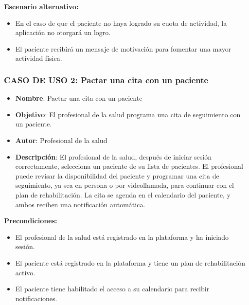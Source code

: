 \documentclass{article}
\begin{document}
\textbf{Escenario alternativo:}
\begin{itemize}
	\item En el caso de que el paciente no haya logrado su cuota de actividad, la aplicación no otorgará un logro.
	\item El paciente recibirá un mensaje de motivación para fomentar una mayor actividad física.
\end{itemize}


\subsubsection*{CASO DE USO 2: Pactar una cita con un paciente}

\begin{itemize}
	\item \textbf{Nombre}: Pactar una cita con un paciente
	\item \textbf{Objetivo}: El profesional de la salud programa una cita de seguimiento con un paciente.
	\item \textbf{Autor}: Profesional de la salud
	\item \textbf{Descripción}: 
	El profesional de la salud, después de iniciar sesión correctamente, selecciona un paciente de su lista de pacientes. El profesional puede revisar la disponibilidad del paciente y programar una cita de seguimiento, ya sea en persona o por videollamada, para continuar con el plan de rehabilitación. La cita se agenda en el calendario del paciente, y ambos reciben una notificación automática.
\end{itemize}

\textbf{Precondiciones:}
\begin{itemize}
	\item El profesional de la salud está registrado en la plataforma y ha iniciado sesión.
	\item El paciente está registrado en la plataforma y tiene un plan de rehabilitación activo.
	\item El paciente tiene habilitado el acceso a su calendario para recibir notificaciones.
\end{itemize}
\end{document}
